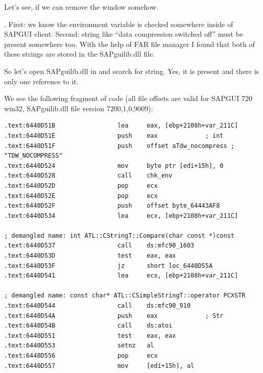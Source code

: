 {Let's see, if we can remove the window somehow}.

.
{First: we know the environment variable \IT{\TDWNC} is checked somewhere inside of SAPGUI client.}
{Second: string like ``data compression switched off'' must be present somewhere too.}
{With the help of FAR file manager I found that both of these strings are stored in the SAPguilib.dll file.}

{So let's open SAPguilib.dll in \IDA and search for  string. 
Yes, it is present and there is only one reference to it.}

{We see the following fragment of code 
(all file offsets are valid for SAPGUI 720 win32, SAPguilib.dll file version 7200,1,0,9009)}:

\begin{lstlisting}
.text:6440D51B                 lea     eax, [ebp+2108h+var_211C]
.text:6440D51E                 push    eax             ; int
.text:6440D51F                 push    offset aTdw_nocompress ; "TDW_NOCOMPRESS"
.text:6440D524                 mov     byte ptr [edi+15h], 0
.text:6440D528                 call    chk_env
.text:6440D52D                 pop     ecx
.text:6440D52E                 pop     ecx
.text:6440D52F                 push    offset byte_64443AF8
.text:6440D534                 lea     ecx, [ebp+2108h+var_211C]

; demangled name: int ATL::CStringT::Compare(char const *)const
.text:6440D537                 call    ds:mfc90_1603
.text:6440D53D                 test    eax, eax
.text:6440D53F                 jz      short loc_6440D55A
.text:6440D541                 lea     ecx, [ebp+2108h+var_211C]

; demangled name: const char* ATL::CSimpleStringT::operator PCXSTR 
.text:6440D544                 call    ds:mfc90_910
.text:6440D54A                 push    eax             ; Str
.text:6440D54B                 call    ds:atoi
.text:6440D551                 test    eax, eax
.text:6440D553                 setnz   al
.text:6440D556                 pop     ecx
.text:6440D557                 mov     [edi+15h], al
\end{lstlisting}

